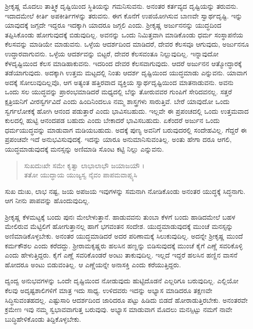 ಶ್ರೀಕೃಷ್ಣ ಮೊದಲು ತಾತ್ತ್ವಿಕ ದೃಷ್ಟಿಯಿಂದ ಸ್ಥಿತಿಯನ್ನು ಗಮನಿಸುವನು. ಅನಂತರ ಕರ್ತವ್ಯದ ದೃಷ್ಟಿಯನ್ನು ತರುವನು. ಇದಾದಮೇಲೆ ಕೀರ್ತಿ ಅಪಕೀರ್ತಿಗಳನ್ನು ತರುವನು. ಈಗ ಕೊನೆಗೆ ಉಪಯೋಗಿಸುವ ಬಾಣವೇ ಸ್ವಾರ್ಥದೃಷ್ಟಿ. ಇನ್ನು ಯಾವುದಕ್ಕೆ ಜಗ್ಗದೇ ಇದ್ದರೂ ಇದಕ್ಕಾಗಿ ಯಾದರೂ ಜಗ್ಗಲಿ ಎಂದು. ಶ್ರೀಕೃಷ್ಣ ಅರ್ಜುನನನ್ನು ಯುದ್ಧದಿಂದ ತಪ್ಪಿಸಿಕೊಂಡು ಹೋಗುವುದಕ್ಕೆ ಬಿಡುವುದಿಲ್ಲ. ಅವನನ್ನು ಒಂದು ನಿಮಿತ್ತವಾಗಿ ಮಾಡಿಕೊಂಡು ಧರ್ಮ ಸಂಸ್ಥಾಪನೆಯ ಕೆಲಸವನ್ನು ಮಾಡಿಯೇ ಮಾಡುವನು. ಒಳ್ಳೆಯ ಆದರ್ಶದಿಂದ ಮಾಡಿದರೆ, ದೇವರ ಕೆಲಸವೂ ಆಗುವುದು, ಅರ್ಜುನನೂ ಉದ್ಧಾರವಾಗುವನು. ಒಳ್ಳೆಯ ಆದರ್ಶವನ್ನು ಬಿಟ್ಟರೆ, ದೇವರ ಕೆಲಸವಂತೂ ನಿಲ್ಲುವುದಿಲ್ಲ. ಇನ್ನಾವುದೋ ಕೆಳದೃಷ್ಟಿಯಿಂದ ಕೆಲಸ ಮಾಡಿಹಾಕುವನು. ಇದರಿಂದ ದೇವರ ಕೆಲಸವಾಗುವುದು. ಆದರೆ ಅರ್ಜುನನ ಆತ್ಮೋದ್ಧಾರಕ್ಕೆ ತಡೆಯಾಗುವುದು. ಅದಕ್ಕಾಗಿ ಉತ್ತಮ ಮಟ್ಟದಲ್ಲಿ ನಿಂತು ಆದರ್ಶ ದೃಷ್ಟಿಯಿಂದ ಯುದ್ಧಮಾಡು ಎನ್ನುವನು. ಯಾವಾಗ ಅದಕ್ಕೆ ಸೋಲುವುದಿಲ್ಲವೊ, ಆಗ ಅತ್ಯಂತ ಹತ್ತಿರವಾದ ವ್ಯಕ್ತಿಯ ಸ್ವಾರ್ಥದೃಷ್ಟಿಯಿಂದ ಮಾತನಾಡುವನು. ಅವನು ಒಂದು ಸಲ ಯುದ್ಧವನ್ನು ಪ್ರಾರಂಭಮಾಡಿದರೆ ಮಧ್ಯದಲ್ಲಿ ಬೆನ್ನು ತೋರುವವರ ಗುಂಪಿಗೆ ಸೇರಿದವನಲ್ಲ. ಸತ್ತರೆ ಕ್ಷತ್ರಿಯನಿಗೆ ವೀರಸ್ವರ್ಗವಿದೆ ಎಂದು ಹಿಂದಿನಿಂದಲೂ ನಮ್ಮ ಶಾಸ್ತ್ರಗಳು ಸಾರುತ್ತಿವೆ. ಬೇರೆ ಯಾವುದೋ ಒಂದು ಸ್ವರ್ಗಲೋಕಕ್ಕೆ ಹೋಗಿ ಆನಂದ ಪಡುತ್ತಾರೆ ಎಂದು ಭಾವಿಸಬಹುದು. ಇಲ್ಲವೇ ಈ ಪ್ರಪಂಚದಲ್ಲಿ ಒಂದು ಉತ್ತಮವಾದ ಕುಲದಲ್ಲಿ ಹುಟ್ಟಿ ಆನಂದಪಡ ಬಹುದು ಎಂದು ಬೇಕಾದರೆ ಭಾವಿಸಬಹುದು. ಏಕೆಂದರೆ ಅರ್ಜುನ ಒಂದು ಧರ್ಮಯುದ್ಧವನ್ನು ಮಾಡುವಾಗ ಮಡಿಯಬಹುದು. ಅದಕ್ಕೆ ಪುಣ್ಯ ಅವನಿಗೆ ಬರುವುದರಲ್ಲಿ ಸಂದೇಹವಿಲ್ಲ. ಗೆದ್ದರೆ ಈ ಪ್ರಪಂಚವೇ ಇದೆ ಅನುಭವಿಸುವುದಕ್ಕೆ. ಇದನ್ನು ಯಾರೂ ಅನುಮಾನಿಸುವಂತಿಲ್ಲ. ಅಂತು ಹೇಗಾ ದರೂ ಆಗಲಿ, ಯುದ್ಧಮಾಡುವುದಕ್ಕೆ ಮನಸ್ಸನ್ನು ಅಣಿಮಾಡಿ ಸೊಂಟ ಕಟ್ಟಿ ನಿಲ್ಲು ಎನ್ನುವನು.

\begin{verse}
ಸುಖದುಃಖೇ ಸಮೇ ಕೃತ್ವಾ ಲಾಭಾಲಾಭೌ ಜಯಾಜಯೌ ।\\ತತೋ ಯುದ್ಧಾಯ ಯುಜ್ಯಸ್ವ ನೈವಂ ಪಾಪಮವಾಪ್ಸ್ಯಸಿ 
\end{verse}

{\small ಸುಖ ದುಃಖ, ಲಾಭ ನಷ್ಟ, ಜಯ ಅಪಜಯ ಇವುಗಳನ್ನು ಸಮನಾಗಿ ನೋಡಿಕೊಂಡು ಅನಂತರ ಯುದ್ಧಕ್ಕೆ ಸಿದ್ಧನಾಗು. ಆಗ ನೀನು ಪಾಪವನ್ನು ಹೊಂದುವುದಿಲ್ಲ.}

ಶ್ರೀಕೃಷ್ಣ ಕೆಳಮಟ್ಟಕ್ಕೆ ಬಂದು ಪುನಃ ಮೇಲೇಳುತ್ತಾನೆ. ಹಾಡುವವನು ತುಂಬಾ ಕೆಳಗೆ ಬಂದು ಹಾಡಿದಮೇಲೆ ಬಹಳ ಮೇಲಿರುವ ಮೆಟ್ಟಿಲಿಗೆ ಹೋಗುತ್ತಾನಲ್ಲ ಹಾಗೆ ಭಗವಂತನ ಸಂದೇಶ. ಯುದ್ಧಮಾಡುವುದಕ್ಕೆ ಮುಂಚೆ ಮನಸ್ಸನ್ನು ಅಣಿಮಾಡಿಕೊಳ್ಳಬೇಕು. ಅನಂತರ ಯುದ್ಧಮಾಡಿದರೆ ಅದರ ಪರಿಣಾಮಕ್ಕೆ ಸಿಲುಕುವುದಿಲ್ಲ. ಅದನ್ನೇ ಶ್ರೀಕೃಷ್ಣ ಮುಂದೆ ಕರ್ಮಕೌಶಲ ಎಂದು ಕರೆದದ್ದು. ಶ್ರೀರಾಮಕೃಷ್ಣರು ಹಲಸಿನ ಹಣ್ಣನ್ನು ಬಿಡಿಸುವುದಕ್ಕೆ ಮುಂಚೆ ಕೈಗೆ ಎಣ್ಣೆ ಸವರಿಕೊಳ್ಳಿ ಎಂದು ಹೇಳುತ್ತಿದ್ದರು. ಕೈಗೆ ಎಣ್ಣೆ ಸವರಿಕೊಂಡರೆ ಅಂಟು ತಾಕುವುದಿಲ್ಲ. ಇಲ್ಲದೆ ಇದ್ದರೆ ಹಲಸಿನ ಹಣ್ಣಿನ ವಾಸನೆ ಹೋದರೂ ಅಂಟು ಬಿಡುವಂತಿಲ್ಲ. ಆ ಎಣ್ಣೆಯನ್ನೇ ಅನಾಸಕ್ತಿ ಎಂದು ಕರೆಯುತ್ತಿದ್ದರು.

ದ್ವಂದ್ವ ಅನುಭವಗಳನ್ನು ಒಂದೇ ದೃಷ್ಟಿಯಿಂದ ನೋಡುವುದು ಹುಟ್ಟಿದೊಡನೆ ಎಲ್ಲರಿಗೂ ಬರುವುದಿಲ್ಲ. ಎಲ್ಲಿಯೋ ಕೆಲವು ಅದೃಷ್ಟಶಾಲಿಗಳಿಗೆ ಮಾತ್ರ ಇದು ಸಾಧ್ಯ. ಉಳಿದವರು ಇದನ್ನು ಅಭ್ಯಾಸ ಮಾಡಿದರೂ ತಕ್ಷಣವೇ ಸಿದ್ಧಿಸುವಂತಹದಲ್ಲ. ಎಷ್ಟುಸಾರಿ ಆದರ್ಶದಿಂದ ಜಾರಿದರೂ ಪಟ್ಟು ಹಿಡಿದು ಬಿಡದೆ ಹೋರಾಡುತ್ತಿರಬೇಕು. ಅನಂತರವೇ ಕ್ರಮೇಣ ಇವು ನಮ್ಮ ಸ್ವಭಾವವಾಗುತ್ತ ಬರುವುವು. ಅಭ್ಯಾಸ ಮಾಡುವಾಗ ಮೊದಲು ಮನಸ್ಸಿಟ್ಟು ನಮಗೆ ನಾವೇ ಬುದ್ಧಿಹೇಳಿಕೊಂಡು ತಿದ್ದಿಕೊಳ್ಳಬೇಕು.


